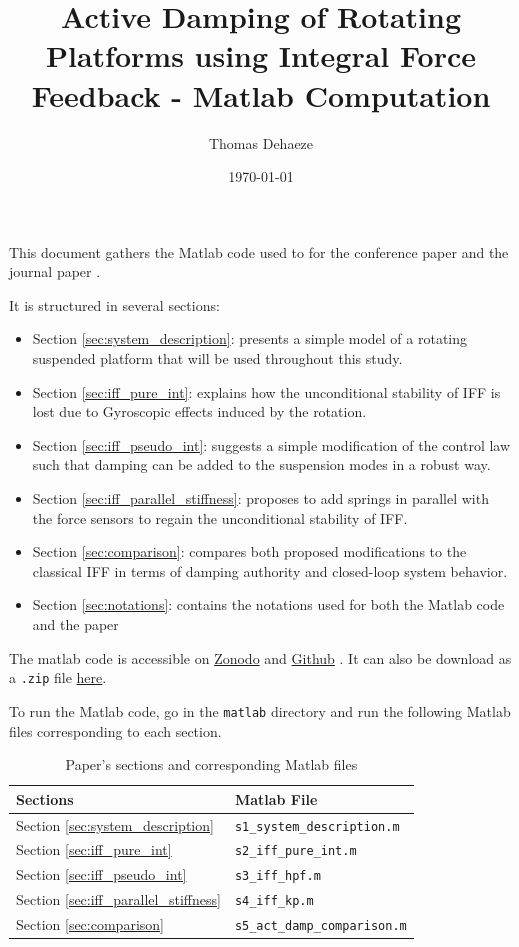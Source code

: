 \documentclass[a4paper, 10pt, DIV=12, parskip=full]{scrreprt}
\author{Thomas Dehaeze}
\date{\today}
\title{Active Damping of Rotating Platforms using Integral Force Feedback - Matlab Computation}
\begin{document}
\maketitle
\tableofcontents


This document gathers the Matlab code used to for the conference paper \cite{dehaeze20_activ_dampin_rotat_platf_integ_force_feedb} and the journal paper \cite{dehaeze21_activ_dampin_rotat_platf_using}.

It is structured in several sections:
\begin{itemize}
\item Section \ref{sec:system_description}: presents a simple model of a rotating suspended platform that will be used throughout this study.
\item Section \ref{sec:iff_pure_int}: explains how the unconditional stability of IFF is lost due to Gyroscopic effects induced by the rotation.
\item Section \ref{sec:iff_pseudo_int}: suggests a simple modification of the control law such that damping can be added to the suspension modes in a robust way.
\item Section \ref{sec:iff_parallel_stiffness}: proposes to add springs in parallel with the force sensors to regain the unconditional stability of IFF.
\item Section \ref{sec:comparison}: compares both proposed modifications to the classical IFF in terms of damping authority and closed-loop system behavior.
\item Section \ref{sec:notations}: contains the notations used for both the Matlab code and the paper
\end{itemize}

The matlab code is accessible on \href{https://zenodo.org/record/3894343}{Zonodo} and \href{https://github.com/tdehaeze/dehaeze20\_contr\_stewa\_platf}{Github} \cite{dehaeze20_activ_dampin_rotat_posit_platf}. It can also be download as a \texttt{.zip} file \href{matlab.zip}{here}.

To run the Matlab code, go in the \texttt{matlab} directory and run the following Matlab files corresponding to each section.

\begin{table}[htbp]
\caption{Paper's sections and corresponding Matlab files}
\centering
\begin{tabular}{ll}
Sections & Matlab File\\
\hline
Section \ref{sec:system_description} & \texttt{s1\_system\_description.m}\\
Section \ref{sec:iff_pure_int} & \texttt{s2\_iff\_pure\_int.m}\\
Section \ref{sec:iff_pseudo_int} & \texttt{s3\_iff\_hpf.m}\\
Section \ref{sec:iff_parallel_stiffness} & \texttt{s4\_iff\_kp.m}\\
Section \ref{sec:comparison} & \texttt{s5\_act\_damp\_comparison.m}\\
\end{tabular}
\end{table}
\end{document}
